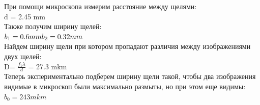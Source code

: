 \documentclass[a4paper,12pt]{article} %
\begin{document}
При помощи микроскопа измерим расстояние между щелями: \\
d = 2.45 mm\\
Также получим ширину щелей: \\
$b_1 = 0.6 mm \\
b_2 = 0.32 mm$ \\
Найдем ширину щели при котором пропадают различия между изображениями двух щелей: \\
D= $\frac{f_1 \lambda}{d}$ = 27.3 mkm \\
Теперь экспериментально подберем ширину щели такой, чтобы два изображения
видимые в микроскоп были максимально размыты, но при этом еще видимы:  $ b_0 = 243  mkm$
\end{document}
